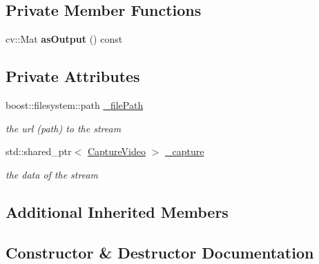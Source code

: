 \subsection*{Private Member Functions}
\begin{DoxyCompactItemize}
\item 
\mbox{\label{classfilter_1_1data_1_1_stream_video_input_ac0f51ef968ee512794899285ab8ea19e}} 
cv\+::\+Mat {\bfseries as\+Output} () const
\end{DoxyCompactItemize}
\subsection*{Private Attributes}
\begin{DoxyCompactItemize}
\item 
\mbox{\label{classfilter_1_1data_1_1_stream_video_input_a26e904ab67ffbc27129437a7c15f6d9f}} 
boost\+::filesystem\+::path \hyperlink{classfilter_1_1data_1_1_stream_video_input_a26e904ab67ffbc27129437a7c15f6d9f}{\+\_\+file\+Path}
\begin{DoxyCompactList}\small\item\em the url (path) to the stream \end{DoxyCompactList}\item 
\mbox{\label{classfilter_1_1data_1_1_stream_video_input_add7945450da53fbfbb1a751f983a30c9}} 
std\+::shared\+\_\+ptr$<$ \hyperlink{class_capture_video}{Capture\+Video} $>$ \hyperlink{classfilter_1_1data_1_1_stream_video_input_add7945450da53fbfbb1a751f983a30c9}{\+\_\+capture}
\begin{DoxyCompactList}\small\item\em the data of the stream \end{DoxyCompactList}\end{DoxyCompactItemize}
\subsection*{Additional Inherited Members}


\subsection{Constructor \& Destructor Documentation}
\mbox{\label{classfilter_1_1data_1_1_stream_video_input_a5e3d671ab429874556b35a5a696aa390}} 
